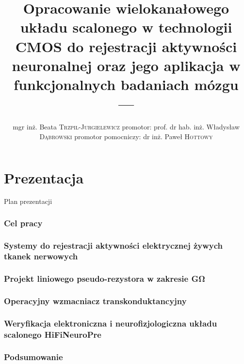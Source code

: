 \documentclass[aspectratio=1610, polish]{beamer}
\author[Beata Trzpil-Jurgielewicz]{mgr inż. Beata \textsc{Trzpil-Jurgielewicz}
\newline 
promotor:
\newline
prof. dr hab. inż. Władysław \textsc{Dąbrowski} 
\newline 
promotor pomocniczy:
\newline
dr inż. Paweł \textsc{Hottowy}}
\date{}
\title[]{Opracowanie wielokanałowego układu scalonego w technologii CMOS do rejestracji aktywności neuronalnej oraz jego aplikacja w funkcjonalnych badaniach mózgu
	}
\title{---}
\begin{document}

\part{Prezentacja}

\maketitle


\begin{frame}{Plan prezentacji}
	\tableofcontents%
\end{frame}
\section{Cel pracy}

\section{Systemy do rejestracji aktywności elektrycznej żywych tkanek nerwowych}
\section{Projekt liniowego pseudo-rezystora w zakresie \si{\giga\ohm}}
\section{Operacyjny wzmacniacz transkonduktancyjny}
\section{Weryfikacja elektroniczna i neurofizjologiczna układu scalonego HiFiNeuroPre}
\section{Podsumowanie}
\section*{}


\end{document}
